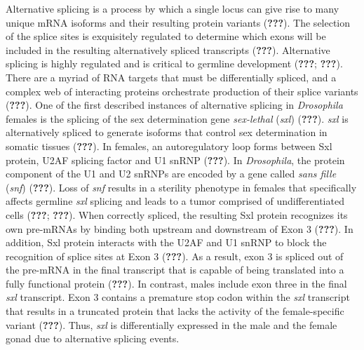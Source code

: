 \documentclass[12pt,oneside]{reedthesis}
\begin{document}
Alternative splicing is a process by which a single locus can give rise
to many unique mRNA isoforms and their resulting protein variants
({\textbf{???}}). The selection of the splice sites is exquisitely
regulated to determine which exons will be included in the resulting
alternatively spliced transcripts ({\textbf{???}}). Alternative splicing
is highly regulated and is critical to germline development
({\textbf{???}}; {\textbf{???}}). There are a myriad of RNA targets that
must be differentially spliced, and a complex web of interacting
proteins orchestrate production of their splice variants ({\textbf{???}}).
One of the first described instances of alternative splicing in
\emph{Drosophila} females is the splicing of the sex determination gene
\emph{sex-lethal} (\emph{sxl}) ({\textbf{???}}). \emph{sxl} is alternatively spliced to
generate isoforms that control sex determination in somatic tissues
({\textbf{???}}). In females, an autoregulatory loop forms between Sxl
protein, U2AF splicing factor and U1 snRNP ({\textbf{???}}). In
\emph{Drosophila}, the protein component of the U1 and U2 snRNPs are encoded
by a gene called \emph{sans fille} (\emph{snf}) ({\textbf{???}}). Loss of \emph{snf}
results in a sterility phenotype in females that specifically affects
germline \emph{sxl} splicing and leads to a tumor comprised of
undifferentiated cells ({\textbf{???}}; {\textbf{???}}). When
correctly spliced, the resulting Sxl protein recognizes its own
pre-mRNAs by binding both upstream and downstream of Exon 3
({\textbf{???}}). In addition, Sxl protein interacts with the U2AF and
U1 snRNP to block the recognition of splice sites at Exon 3
({\textbf{???}}). As a result, exon 3 is spliced out of the pre-mRNA
in the final transcript that is capable of being translated into a fully
functional protein ({\textbf{???}}). In contrast, males include exon
three in the final \emph{sxl} transcript. Exon 3 contains a premature stop
codon within the \emph{sxl} transcript that results in a truncated protein
that lacks the activity of the female-specific variant ({\textbf{???}}).
Thus, \emph{sxl} is differentially expressed in the male and the female gonad
due to alternative splicing events.
\end{document}
